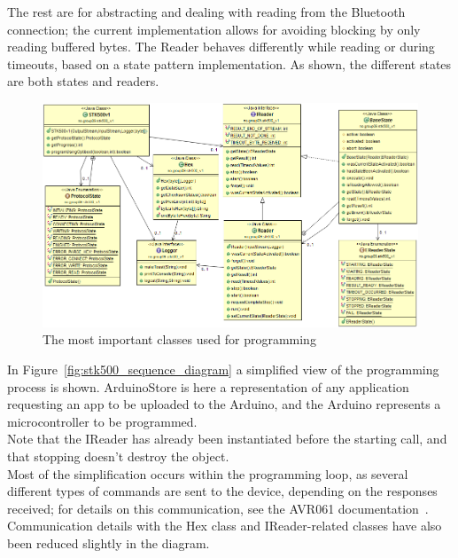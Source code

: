     The rest are for abstracting and dealing with reading from the Bluetooth connection; the current
    implementation allows for avoiding blocking by only reading buffered bytes. The Reader behaves differently while
    reading or during timeouts, based on a state pattern implementation. As shown, the different states are both
    states and readers.\\

	\begin{figure}[H]
	\hspace*{-1.0in}
	\includegraphics[scale=0.58]{images/UML/stk500v1.png}
	\caption[UML - Protocol]{The most important classes used for programming}
	\label{fig:stk500v1uml}
	\end{figure}

	In Figure~\ref{fig:stk500_sequence_diagram} a simplified view of the programming process is shown. ArduinoStore is here a representation of any application requesting an app to be uploaded to the Arduino,
	and the Arduino represents a microcontroller to be programmed.\\
	
	Note that the IReader has already been instantiated before the starting call, and that stopping doesn't
	destroy the object.\\
	
	Most of the simplification occurs within the programming loop, as several different types of commands
	are sent to the device, depending on the responses received; for details on this communication, see the AVR061 documentation~\cite{AVR061}. Communication details with the Hex class and IReader-related classes have also been reduced slightly in the diagram.\\
	
